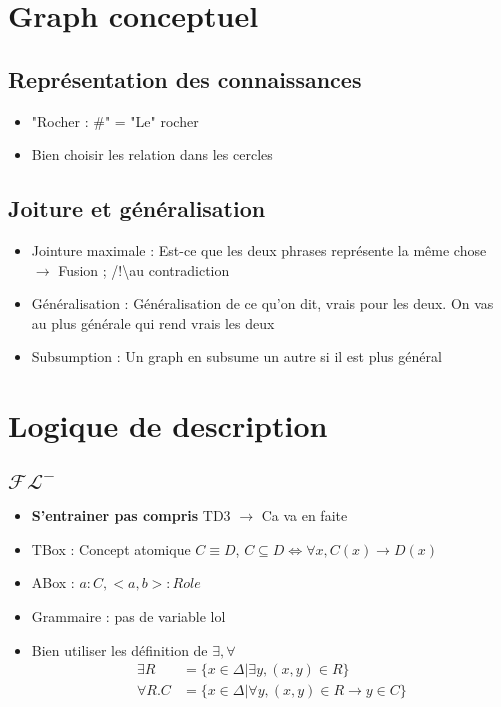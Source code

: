 \documentclass{article}
\theoremstyle{plain}%
\theoremstyle{definition}
\theoremstyle{remark}
\begin{document}
\section{Graph conceptuel}
\subsection{Représentation des connaissances}
\begin{itemize}
    \item "Rocher : \#" = "Le" rocher
    \item Bien choisir les relation dans les cercles
\end{itemize}
\subsection{Joiture et généralisation}
\begin{itemize}
    \item Jointure maximale : Est-ce que les deux phrases représente la même chose $\rightarrow$ Fusion ; /!\textbackslash au contradiction
    \item Généralisation : Généralisation de ce qu'on dit, vrais pour les deux. On vas au plus générale qui rend vrais les deux
    \item Subsumption : Un graph en subsume un autre si il est plus général
\end{itemize}

\section{Logique de description}
\subsection{$ \mathcal{FL}^- $ }
\begin{itemize}
    \item \textbf{S'entrainer pas compris} TD3 $\rightarrow$ Ca va en faite
    \item TBox : Concept atomique $ C \equiv D $, $ C \subseteq D \Leftrightarrow \forall x, C(x) \to D(x)$ 
    \item ABox : $ a : C, <a,b> : Role $ 
    \item Grammaire : pas de variable lol
    \item Bien utiliser les définition de $ \exists , \forall  $ \begin{align*}
        \exists R &= \{x \in \Delta | \exists y, (x,y) \in R\} \\
        \forall R.C &= \{x \in \Delta | \forall y, (x,y) \in R \to y \in C \}
    \end{align*}
\end{itemize}
\end{document}

